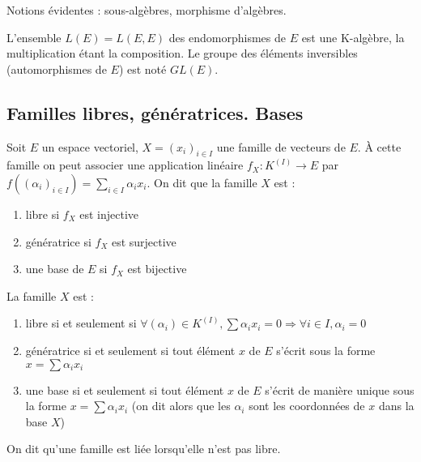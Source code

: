 \begin{rem}
Notions évidentes : sous-algèbres, morphisme d'algèbres.
\end{rem}

\begin{rem}
L'ensemble $L(E) = L(E,E)$ des endomorphismes de $E$ est une K-algèbre, la multiplication étant la composition. Le groupe des éléments inversibles (automorphismes de $E$) est noté $GL(E)$.
\end{rem}

\subsection{Familles libres, génératrices. Bases}

\begin{de}
Soit $E$ un espace vectoriel, $X = (x_i)_{i\in I}$ une famille de vecteurs de $E$. À cette famille on peut associer une application linéaire $f_X : K^{(I)} \to E$ par $f((\alpha_i)_{i\in I}) = \sum_{i\in I} \alpha_i x_i$. On dit que la famille $X$ est :
\begin{enumerate}
\item libre si $f_X$ est injective
\item génératrice si $f_X$ est surjective
\item une base de $E$ si $f_X$ est bijective
\end{enumerate}
\end{de}

\begin{prop}
La famille $X$ est :
\begin{enumerate}
\item libre si et seulement si $\forall (\alpha_i) \in K^{(I)}, \sum \alpha_i x_i = 0 \Rightarrow \forall i \in I, \alpha_i = 0$
\item génératrice si et seulement si tout élément $x$ de $E$ s'écrit sous la forme $x = \sum \alpha_i x_i$
\item une base si et seulement si tout élément $x$ de $E$ s'écrit de manière unique sous la forme $x = \sum \alpha_i x_i$ (on dit alors que les $\alpha_i$ sont les coordonnées de $x$ dans la base $X$)
\end{enumerate}
\end{prop}

\begin{de}
On dit qu'une famille est liée lorsqu'elle n'est pas libre.
\end{de}

